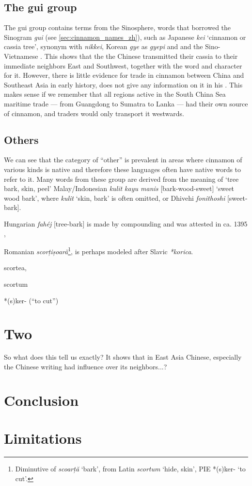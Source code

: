 \subsection{The gui group}

The gui group contains terms from the Sinosphere, words that borrowed the Sinogram  \textit{gui} (see \cref{sec:cinnamon_names_zh}), such as Japanese  \textit{kei} `cinnamon or cassia tree', synonym with  \textit{nikkei}, Korean  \textit{gye} as  \textit{gyepi} and  and the Sino-Vietnamese . This shows that the the Chinese transmitted their cassia to their immediate neighbors East and Southwest, together with the word and character for it. However, there is little evidence for trade in cinnamon between China and Southeast Asia in early history, \textcite{wang_nanhai_1958} does not give any information on it in his . \autocite{wang_nanhai_1958} This makes sense if we remember that all regions active in the South China Sea maritime trade --- from Guangdong to Sumatra to Lanka --- had their own source of cinnamon, and traders would only transport it westwards.


\subsection{Others}

We can see that the category of ``other'' is prevalent in areas where cinnamon of various kinds is native and therefore these languages often have native words to refer to it. Many words from these group are derived from the meaning of `tree bark, skin, peel' Malay/Indonesian \textit{kulit kayu manis} [bark-wood-sweet] `sweet wood bark', where \textit{kulit} `skin, bark' is often omitted, or Dhivehi \textit{fonithoshi} [sweet-bark]. 



Hungarian \textit{fahéj} [tree-bark] is made by compounding and was attested in ca. 1395 \autocite[s.v. fahéj]{zaicz_etimologiai_2006},

Romanian \textit{scorțișoară}\footnote{Diminutive of \textit{scoarță} `bark', from Latin \textit{scortum} `hide, skin', PIE *(s)ker- `to cut'.}, is perhaps modeled after Slavic \textit{*korica}.

scortea,

scortum

*(s)ker- (“to cut”)



\section{Two}

So what does this tell us exactly? It shows that in East Asia Chinese, especially the Chinese writing had influence over its neighbors...?






\section{Conclusion}


\section{Limitations}

